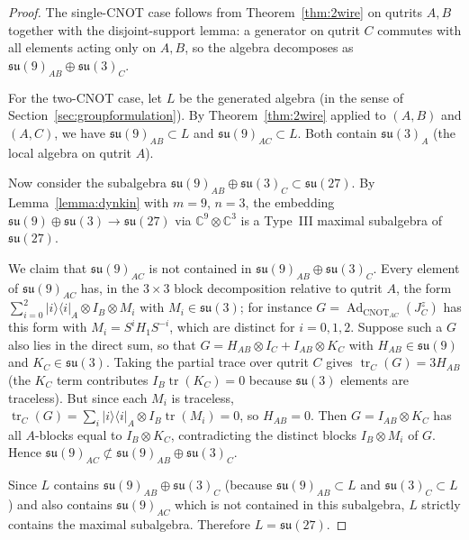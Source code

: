 \documentclass[12pt,a4paper]{article}
\newcommand{\Ad}{\operatorname{Ad}}
\begin{document}
\begin{proof}
The single-CNOT case follows from Theorem~\ref{thm:2wire} on qutrits
$A,B$ together with the disjoint-support lemma: a generator on qutrit $C$
commutes with all elements acting only on $A,B$, so the algebra
decomposes as $\mathfrak{su}(9)_{AB} \oplus \mathfrak{su}(3)_C$.

For the two-CNOT case, let $L$ be the generated algebra (in the sense of
Section~\ref{sec:groupformulation}). By Theorem~\ref{thm:2wire} applied
to $(A,B)$ and $(A,C)$, we have $\mathfrak{su}(9)_{AB} \subset L$ and
$\mathfrak{su}(9)_{AC} \subset L$. Both contain $\mathfrak{su}(3)_A$
(the local algebra on qutrit $A$).

Now consider the subalgebra $\mathfrak{su}(9)_{AB} \oplus \mathfrak{su}(3)_C
\subset \mathfrak{su}(27)$. By Lemma~\ref{lemma:dynkin} with $m=9$, $n=3$,
the embedding $\mathfrak{su}(9)\oplus\mathfrak{su}(3) \to
\mathfrak{su}(27)$ via $\mathbb{C}^9\otimes\mathbb{C}^3$ is a Type~III maximal
subalgebra of $\mathfrak{su}(27)$.

We claim that $\mathfrak{su}(9)_{AC}$ is not contained in
$\mathfrak{su}(9)_{AB}\oplus\mathfrak{su}(3)_C$. Every element of
$\mathfrak{su}(9)_{AC}$ has, in the $3\times3$ block decomposition relative
to qutrit $A$, the form $\sum_{i=0}^{2} |i\rangle\langle i|_A \otimes
I_B \otimes M_i$ with $M_i \in \mathfrak{su}(3)$; for instance
$G = \Ad_{\text{CNOT}_{AC}}(J_C^z)$ has this form with
$M_i = S^i H_1 S^{-i}$, which are distinct for $i=0,1,2$. Suppose such a
$G$ also lies in the direct sum, so that
$G = H_{AB} \otimes I_C + I_{AB} \otimes K_C$ with
$H_{AB} \in \mathfrak{su}(9)$ and $K_C \in \mathfrak{su}(3)$. Taking the
partial trace over qutrit $C$ gives $\operatorname{tr}_C(G) = 3 H_{AB}$
(the $K_C$ term contributes $I_B\operatorname{tr}(K_C) = 0$ because
$\mathfrak{su}(3)$ elements are traceless). But since each $M_i$ is
traceless,
$\operatorname{tr}_C(G) = \sum_i |i\rangle\langle i|_A \otimes
I_B \operatorname{tr}(M_i) = 0$, so $H_{AB} = 0$. Then
$G = I_{AB} \otimes K_C$ has all $A$-blocks equal to $I_B \otimes K_C$,
contradicting the distinct blocks $I_B \otimes M_i$ of $G$. Hence
$\mathfrak{su}(9)_{AC} \not\subset \mathfrak{su}(9)_{AB}
\oplus \mathfrak{su}(3)_C$.

Since $L$ contains $\mathfrak{su}(9)_{AB}\oplus\mathfrak{su}(3)_C$
(because $\mathfrak{su}(9)_{AB} \subset L$ and $\mathfrak{su}(3)_C
\subset L$) and also contains $\mathfrak{su}(9)_{AC}$ which is not
contained in this subalgebra, $L$ strictly contains the maximal
subalgebra. Therefore $L = \mathfrak{su}(27)$.


\end{proof}
\end{document}
